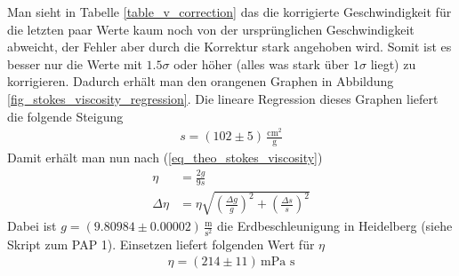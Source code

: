 \documentclass[12pt,a4paper,german]{scrartcl}
\numberwithin{equation}{section}
\begin{document}
  Man sieht in Tabelle \ref{table_v_correction} das die korrigierte Geschwindigkeit für die letzten paar Werte kaum noch von der ursprünglichen Geschwindigkeit abweicht, der Fehler aber durch die Korrektur stark angehoben wird.
  Somit ist es besser nur die Werte mit $1.5\sigma$ oder höher (alles was stark über $1\sigma$ liegt) zu korrigieren. Dadurch erhält man den orangenen Graphen in Abbildung \ref{fig_stokes_viscosity_regression}. Die lineare Regression dieses Graphen liefert die folgende Steigung
  \begin{align}
    s = (102 \pm 5) \, \frac{\text{cm}^2}{\text{g}}
  \end{align}
  Damit erhält man nun nach (\ref{eq_theo_stokes_viscosity})
  \begin{align}
    \eta &= \frac{2 g}{9 s} \nonumber \\
    \Delta \eta &= \eta \sqrt{\left(\frac{\Delta g}{g}\right)^2 + \left(\frac{\Delta s}{s}\right)^2}
  \end{align}
  Dabei ist $g = (9.80984 \pm 0.00002) \, \frac{\text{m}}{\text{s}^2}$ die Erdbeschleunigung in Heidelberg (siehe Skript zum PAP 1). Einsetzen liefert folgenden Wert für $\eta$
  \begin{align}
    \eta = (214 \pm 11) \, \text{mPa s}
  \end{align}
\end{document}
